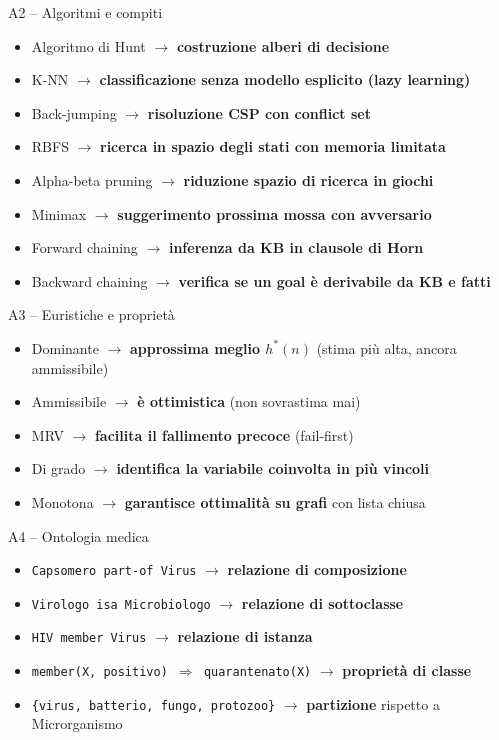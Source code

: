 \documentclass[12pt,a4paper]{article}
\begin{document}
\begin{risposta}{A2 -- Algoritmi e compiti}
\begin{itemize}[noitemsep]
  \item Algoritmo di Hunt $\to$ \textbf{costruzione alberi di decisione}
  \item K-NN $\to$ \textbf{classificazione senza modello esplicito (lazy learning)}
  \item Back-jumping $\to$ \textbf{risoluzione CSP con conflict set}
  \item RBFS $\to$ \textbf{ricerca in spazio degli stati con memoria limitata}
  \item Alpha-beta pruning $\to$ \textbf{riduzione spazio di ricerca in giochi}
  \item Minimax $\to$ \textbf{suggerimento prossima mossa con avversario}
  \item Forward chaining $\to$ \textbf{inferenza da KB in clausole di Horn}
  \item Backward chaining $\to$ \textbf{verifica se un goal è derivabile da KB e fatti}
\end{itemize}
\end{risposta}

\begin{risposta}{A3 -- Euristiche e proprietà}
\begin{itemize}[noitemsep]
  \item Dominante $\to$ \textbf{approssima meglio $h^*(n)$} (stima più alta, ancora ammissibile)
  \item Ammissibile $\to$ \textbf{è ottimistica} (non sovrastima mai)
  \item MRV $\to$ \textbf{facilita il fallimento precoce} (fail-first)
  \item Di grado $\to$ \textbf{identifica la variabile coinvolta in più vincoli}
  \item Monotona $\to$ \textbf{garantisce ottimalità su grafi} con lista chiusa
\end{itemize}
\end{risposta}

\begin{risposta}{A4 -- Ontologia medica}
\begin{itemize}[noitemsep]
  \item \texttt{Capsomero part-of Virus} $\to$ \textbf{relazione di composizione}
  \item \texttt{Virologo isa Microbiologo} $\to$ \textbf{relazione di sottoclasse}
  \item \texttt{HIV member Virus} $\to$ \textbf{relazione di istanza}
  \item \texttt{member(X, positivo) $\Rightarrow$ quarantenato(X)} $\to$ \textbf{proprietà di classe}
  \item \texttt{\{virus, batterio, fungo, protozoo\}} $\to$ \textbf{partizione} rispetto a Microrganismo
\end{itemize}
\end{risposta}
\end{document}
